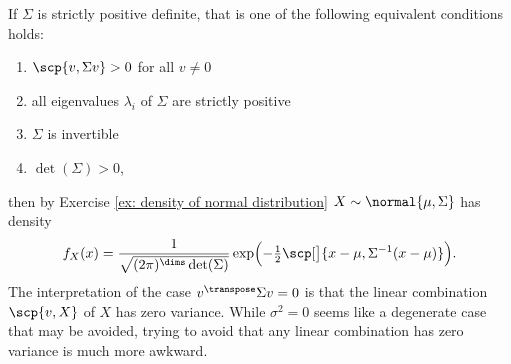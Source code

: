\begin{remark}
    If \(\Sigma\) is strictly positive definite, that is one of the following
    equivalent conditions holds:
    \begin{enumerate}[label={(\roman*)},noitemsep]
        \item \(\scp{v, \Sigma v} > 0\) for all \(v\neq 0\)
        \item all eigenvalues \(\lambda_i\) of \(\Sigma\) are strictly positive
        \item \(\Sigma\) is invertible
        \item \(\det(\Sigma) > 0\),
    \end{enumerate}
    then by Exercise \ref{ex: density of normal distribution} \(X\sim \normal{\mu, \Sigma}\) has density
    \[
        f_X(x)
        = \frac1{\sqrt{(2\pi)^\dims \det(\Sigma)}}
        \exp\Bigl(-\tfrac12 \scp[\big]{x - \mu, \Sigma^{-1}(x - \mu)}\Bigr).
    \]
    The interpretation of the case \(v^\transpose \Sigma v = 0\) is that the
    linear combination \(\scp{v,X}\) of \(X\) has zero variance. While
    \(\sigma^2=0\) seems like a degenerate case that may be avoided, trying to
    avoid that any linear combination has zero variance is much more awkward.
\end{remark}
